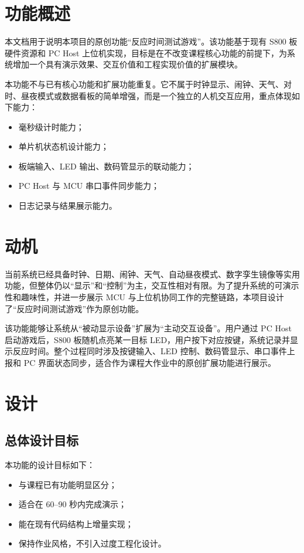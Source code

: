 \documentclass[main.tex]{subfiles}
\begin{document}
\section{功能概述}

本文档用于说明本项目的原创功能“反应时间测试游戏”。该功能基于现有 S800 板硬件资源和 PC Host 上位机实现，目标是在不改变课程核心功能的前提下，为系统增加一个具有演示效果、交互价值和工程实现价值的扩展模块。

本功能不与已有核心功能和扩展功能重复。它不属于时钟显示、闹钟、天气、对时、昼夜模式或数据看板的简单增强，而是一个独立的人机交互应用，重点体现如下能力：

\begin{itemize}[leftmargin=2em]
  \item 毫秒级计时能力；
  \item 单片机状态机设计能力；
  \item 板端输入、LED 输出、数码管显示的联动能力；
  \item PC Host 与 MCU 串口事件同步能力；
  \item 日志记录与结果展示能力。
\end{itemize}

\section{动机}

当前系统已经具备时钟、日期、闹钟、天气、自动昼夜模式、数字孪生镜像等实用功能，但整体仍以“显示”和“控制”为主，交互性相对有限。为了提升系统的可演示性和趣味性，并进一步展示 MCU 与上位机协同工作的完整链路，本项目设计了“反应时间测试游戏”作为原创功能。

该功能能够让系统从“被动显示设备”扩展为“主动交互设备”。用户通过 PC Host 启动游戏后，S800 板随机点亮某一目标 LED，用户按下对应按键，系统记录并显示反应时间。整个过程同时涉及按键输入、LED 控制、数码管显示、串口事件上报和 PC 界面状态同步，适合作为课程大作业中的原创扩展功能进行展示。

\section{设计}

\subsection{总体设计目标}

本功能的设计目标如下：

\begin{itemize}[leftmargin=2em]
  \item 与课程已有功能明显区分；
  \item 适合在 60--90 秒内完成演示；
  \item 能在现有代码结构上增量实现；
  \item 保持作业风格，不引入过度工程化设计。
\end{itemize}
\end{document}
